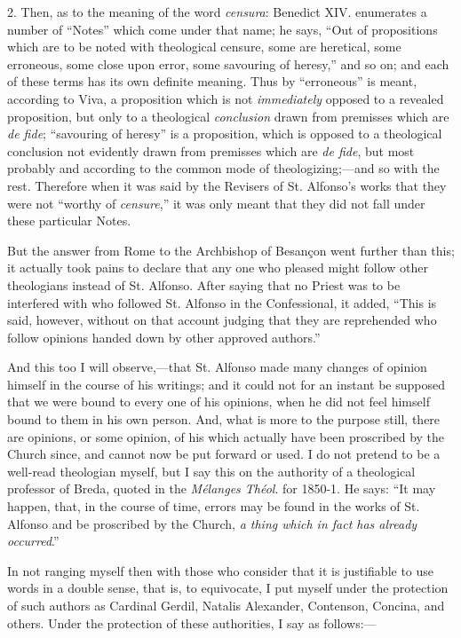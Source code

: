 2. Then, as to the meaning of the word \emph{censura}: Benedict XIV.
enumerates a number of ``Notes'' which come under that name; he
says, ``Out of propositions which are to be noted with theological
censure, some are heretical, some erroneous, some close upon error, some
savouring of heresy,'' and so on; and each of these terms has
its own definite meaning. Thus by ``erroneous'' is meant,
according to Viva, a proposition which is not \emph{immediately} opposed
to a revealed proposition, but only to a theological \emph{conclusion}
drawn from premisses which are \emph{de fide}; ``savouring of heresy''
is a proposition, which is opposed to a
theological conclusion not evidently drawn from premisses which are \emph{de
fide}, but most probably and according to the common mode of
theologizing;—and so with the rest. Therefore when it was
said by the Revisers of St. Alfonso's works that they were not
``worthy of \emph{censure},'' it was only meant that they did
not fall under these particular Notes.

But the answer from Rome to the Archbishop of Besançon went further than this; it actually took pains to declare that any
one who pleased might follow other theologians instead of St. Alfonso.
After saying that no Priest was to be interfered with who followed St.
Alfonso in the Confessional, it added, ``This is said, however, without
on that account judging that they are reprehended who follow opinions
handed down by other approved authors.''

And this too I will observe,—that St. Alfonso made many
changes of opinion himself in the course of his writings; and it could
not for an instant be supposed that we were bound to every one of his
opinions, when he did not feel himself bound to them in his own person.
And, what is more to the purpose still, there are opinions, or some
opinion, of his which actually have been proscribed by the
Church since, and cannot now be put forward or used. I do not pretend to
be a well-read theologian myself, but I say this on the authority of a
theological professor of Breda, quoted in the \emph{Mélanges Théol}. for
1850-1. He says: ``It may happen, that, in the course of time,
errors may be found in the works of St. Alfonso and be proscribed by the
Church, \emph{a thing which in fact has already occurred}.''

In not ranging myself then with those who consider that it is
justifiable to use words in a double sense, that is, to equivocate, I
put myself under the protection of such authors
as Cardinal Gerdil, Natalis
Alexander, Contenson, Concina, and others. Under the protection of these authorities, I say as
follows:—

